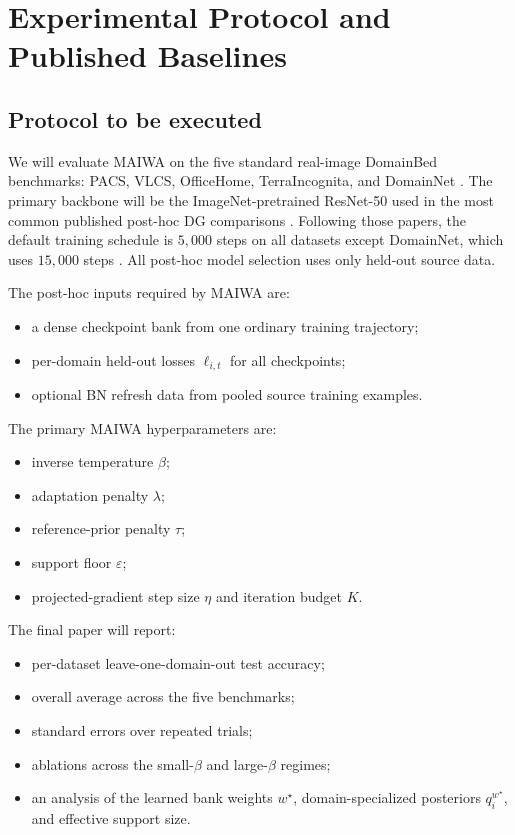 \documentclass{article}
\newcommand{\maiwa}{\textup{\textsc{MAIWA}}}
\begin{document}
\section{Experimental Protocol and Published Baselines}
\label{sec:experiments}

\subsection{Protocol to be executed}

We will evaluate \maiwa{} on the five standard real-image DomainBed benchmarks: PACS, VLCS, OfficeHome, TerraIncognita, and DomainNet \citep{gulrajani2021domainbed,li2017pacs,fang2013vlcs,venkateswara2017officehome,beery2018terraincognita,peng2019domainnet}. The primary backbone will be the ImageNet-pretrained ResNet-50 used in the most common published post-hoc DG comparisons \citep{cha2021swad,rame2022diwa,cha2022miro}. Following those papers, the default training schedule is \(5{,}000\) steps on all datasets except DomainNet, which uses \(15{,}000\) steps \citep{cha2021swad,rame2022diwa}. All post-hoc model selection uses only held-out source data.

The post-hoc inputs required by \maiwa{} are:
\begin{itemize}[leftmargin=1.4em]
    \item a dense checkpoint bank from one ordinary training trajectory;
    \item per-domain held-out losses \(\ell_{i,t}\) for all checkpoints;
    \item optional BN refresh data from pooled source training examples.
\end{itemize}

The primary \maiwa{} hyperparameters are:
\begin{itemize}[leftmargin=1.4em]
    \item inverse temperature \(\beta\);
    \item adaptation penalty \(\lambda\);
    \item reference-prior penalty \(\tau\);
    \item support floor \(\varepsilon\);
    \item projected-gradient step size \(\eta\) and iteration budget \(K\).
\end{itemize}

The final paper will report:
\begin{itemize}[leftmargin=1.4em]
    \item per-dataset leave-one-domain-out test accuracy;
    \item overall average across the five benchmarks;
    \item standard errors over repeated trials;
    \item ablations across the small-\(\beta\) and large-\(\beta\) regimes;
    \item an analysis of the learned bank weights \(w^\star\), domain-specialized posteriors \(q_i^{w^\star}\), and effective support size.
\end{itemize}
\end{document}
